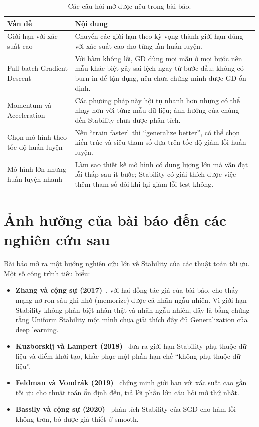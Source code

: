 \begin{table}[H]
\centering
\caption{Các câu hỏi mở được nêu trong bài báo.}
\label{tab:cauhoimo}
\begin{tabular}{|p{3.6cm}|p{9.6cm}|}
\hline
\textbf{Vấn đề} & \textbf{Nội dung} \\ \hline
Giới hạn với xác suất cao & Chuyển các giới hạn theo kỳ vọng thành giới hạn đúng với xác suất cao cho từng lần huấn luyện. \\ \hline
Full-batch Gradient Descent & Với hàm không lồi, GD dùng mọi mẫu ở mọi bước nên mẫu khác biệt gây sai lệch ngay từ bước đầu; không có burn-in để tận dụng, nên chưa chứng minh được GD ổn định. \\ \hline
Momentum và Acceleration & Các phương pháp này hội tụ nhanh hơn nhưng có thể nhạy hơn với từng mẫu dữ liệu; ảnh hưởng của chúng đến Stability chưa được phân tích. \\ \hline
Chọn mô hình theo tốc độ huấn luyện & Nếu ``train faster'' thì ``generalize better'', có thể chọn kiến trúc và siêu tham số dựa trên tốc độ giảm lỗi huấn luyện. \\ \hline
Mô hình lớn nhưng huấn luyện nhanh & Làm sao thiết kế mô hình có dung lượng lớn mà vẫn đạt lỗi thấp sau ít bước; Stability có giải thích được việc thêm tham số đôi khi lại giảm lỗi test không. \\ \hline
\end{tabular}
\end{table}

\section{Ảnh hưởng của bài báo đến các nghiên cứu sau}
\label{sec:anhhuong}

Bài báo mở ra một hướng nghiên cứu lớn về Stability của các thuật toán tối ưu. Một số công trình tiêu biểu:
\begin{itemize}
    \item \textbf{Zhang và cộng sự (2017)}~\cite{zhang2017understanding}, với hai đồng tác giả của bài báo, cho thấy mạng nơ-ron sâu ghi nhớ (memorize) được cả nhãn ngẫu nhiên. Vì giới hạn Stability không phân biệt nhãn thật và nhãn ngẫu nhiên, đây là bằng chứng rằng Uniform Stability một mình chưa giải thích đầy đủ Generalization của deep learning.
    \item \textbf{Kuzborskij và Lampert (2018)}~\cite{kuzborskij2018data} đưa ra giới hạn Stability phụ thuộc dữ liệu và điểm khởi tạo, khắc phục một phần hạn chế ``không phụ thuộc dữ liệu''.
    \item \textbf{Feldman và Vondrák (2019)}~\cite{feldman2019high} chứng minh giới hạn với xác suất cao gần tối ưu cho thuật toán ổn định đều, trả lời phần lớn câu hỏi mở thứ nhất.
    \item \textbf{Bassily và cộng sự (2020)}~\cite{bassily2020stability} phân tích Stability của SGD cho hàm lồi không trơn, bỏ được giả thiết $\beta$-smooth.
\end{itemize}

